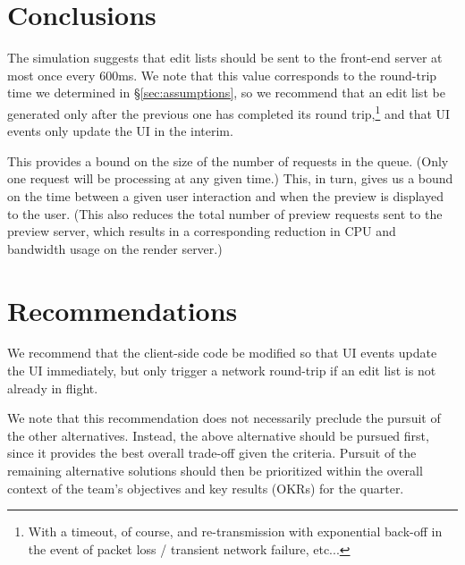 \documentclass[se,resubmit]{uw-wkrpt}
\begin{document}
\section{Conclusions}
The simulation suggests that edit lists should be sent to the front-end
server at most once every 600ms. We note that this value corresponds to the
round-trip time we determined in \S\ref{sec:assumptions}, so we recommend
that an edit list be generated only after the previous one has completed
its round trip,\footnote{With a timeout, of course, and re-transmission
with exponential back-off in the event of packet loss / transient network
failure, etc...} and that UI events only update the UI in the interim.

This provides a bound on the size of the number of requests in the queue.
(Only one request will be processing at any given time.) This, in turn,
gives us a bound on the time between a given user interaction and when the
preview is displayed to the user. (This also reduces the total number of
preview requests sent to the preview server, which results in a
corresponding reduction in CPU and bandwidth usage on the render server.)

\section{Recommendations}
We recommend that the client-side code be modified so that UI events update
the UI immediately, but only trigger a network round-trip if an edit list
is not already in flight.

We note that this recommendation does not necessarily preclude the pursuit
of the other alternatives. Instead, the above alternative should be pursued
first, since it provides the best overall trade-off given the criteria.
Pursuit of the remaining alternative solutions should then be prioritized
within the overall context of the team's objectives and key results (OKRs)
for the quarter.

\backmatter

%
\printbibliography[heading=bibintoc]
\end{document}
